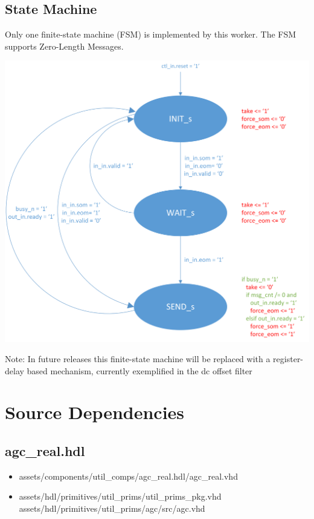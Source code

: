 \documentclass{article}
\def\comp{agc\_real}
\begin{document}
\subsection*{State Machine}
\begin{flushleft}
	Only one finite-state machine (FSM) is implemented by this worker. The FSM supports Zero-Length Messages.
\end{flushleft}
{\centering\captionsetup{type=figure}\includegraphics[scale=0.7]{zlm_fsm}\par{}\label{fig:zlm_fsm}}
\begin{flushleft}
        Note: In future releases this finite-state machine will be replaced with a register-delay based mechanism, currently exemplified in the dc offset filter
\end{flushleft}
\newpage

\section*{Source Dependencies}
\subsection*{\comp.hdl}
\begin{itemize}
	\item assets/components/util\_comps/agc\_real.hdl/agc\_real.vhd
	\item assets/hdl/primitives/util\_prims/util\_prims\_pkg.vhd
		\subitem assets/hdl/primitives/util\_prims/agc/src/agc.vhd
\end{itemize}
\end{document}
